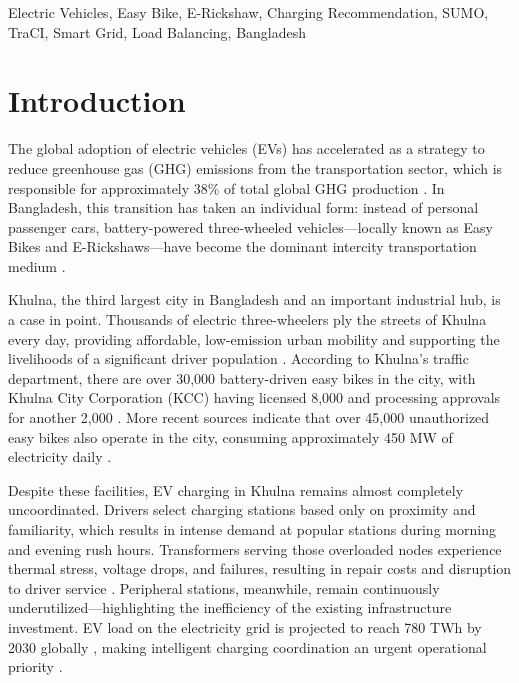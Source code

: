 \documentclass[conference]{IEEEtran}
\begin{document}
\begin{IEEEkeywords}
Electric Vehicles, Easy Bike, E-Rickshaw, Charging Recommendation, SUMO, TraCI, Smart Grid, Load Balancing, Bangladesh
\end{IEEEkeywords}

\section{Introduction}

The global adoption of electric vehicles (EVs) has accelerated as a strategy to reduce greenhouse gas (GHG) emissions from the transportation sector, which is responsible for approximately 38\% of total global GHG production \cite{b1}. In Bangladesh, this transition has taken an individual form: instead of personal passenger cars, battery-powered three-wheeled vehicles---locally known as Easy Bikes and E-Rickshaws---have become the dominant intercity transportation medium \cite{b9, b22}.

Khulna, the third largest city in Bangladesh and an important industrial hub, is a case in point. Thousands of electric three-wheelers ply the streets of Khulna every day, providing affordable, low-emission urban mobility and supporting the livelihoods of a significant driver population \cite{b2}. According to Khulna's traffic department, there are over 30,000 battery-driven easy bikes in the city, with Khulna City Corporation (KCC) having licensed 8,000 and processing approvals for another 2,000 \cite{b2}. More recent sources indicate that over 45,000 unauthorized easy bikes also operate in the city, consuming approximately 450 MW of electricity daily \cite{b3}.

Despite these facilities, EV charging in Khulna remains almost completely uncoordinated. Drivers select charging stations based only on proximity and familiarity, which results in intense demand at popular stations during morning and evening rush hours. Transformers serving those overloaded nodes experience thermal stress, voltage drops, and failures, resulting in repair costs and disruption to driver service \cite{b14}. Peripheral stations, meanwhile, remain continuously underutilized---highlighting the inefficiency of the existing infrastructure investment. EV load on the electricity grid is projected to reach 780 TWh by 2030 globally \cite{b4}, making intelligent charging coordination an urgent operational priority \cite{b16}.
\end{document}
